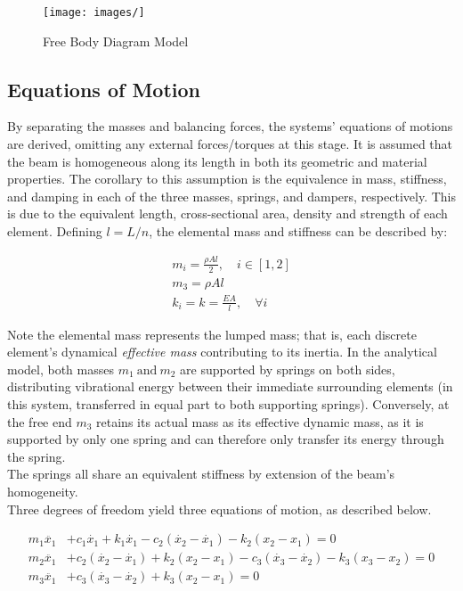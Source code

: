 \documentclass{article}
\begin{document}
\begin{figure}[h!]
    \centering
    \texttt{[image: images/]}
    \caption{Free Body Diagram Model}
    \label{fig:fbd}
\end{figure}

\subsection{Equations of Motion}
\label{1_eom}

By separating the masses and balancing forces, the systems' equations of motions are derived, omitting any external forces/torques at this stage. It is assumed that the beam is homogeneous along its length in both its geometric and material properties. The corollary to this assumption is the equivalence in mass, stiffness, and damping in each of the three masses, springs, and dampers, respectively. This is due to the equivalent length, cross-sectional area, density and strength of each element. Defining $l = L/n$, the elemental mass and stiffness can be described by:

\begin{gather}
    m_i = \frac{\rho A l}{2} ,\quad i\in{[1, 2]} \\
    m_3 = \rho Al \\
    k_i = k = \frac{E A}{l} ,\quad\forall i
\end{gather}

Note the elemental mass represents the lumped mass; that is, each discrete element's dynamical \textit{effective mass} contributing to its inertia. In the analytical model, both masses $m_1\ \text{and}\ m_2$ are supported by springs on both sides, distributing vibrational energy between their immediate surrounding elements (in this system, transferred in equal part to both supporting springs).  Conversely, at the free end $m_3$ retains its actual mass as its effective dynamic mass, as it is supported by only one spring and can therefore only transfer its energy through the spring.\medskip\\
The springs all share an equivalent stiffness by extension of the beam's homogeneity.\medskip\\
Three degrees of freedom yield three equations of motion, as described below.

\begin{equation}
    \begin{aligned}
        m_1\ddot{x_1} &+ c_1\dot{x_1} + k_1\dot{x_1} - c_2(\dot{x_2} - \dot{x_1}) - k_2(x_2 - x_1) = 0 \\
        m_2\ddot{x_1} &+ c_2(\dot{x_2} - \dot{x_1}) + k_2(x_2 - x_1) - c_3(\dot{x_3} - \dot{x_2}) - k_3(x_3 - x_2) = 0 \\
        m_3\ddot{x_1} &+ c_3(\dot{x_3} - \dot{x_2}) + k_3(x_2 - x_1) = 0 \\
    \end{aligned}
\end{equation}
\end{document}
